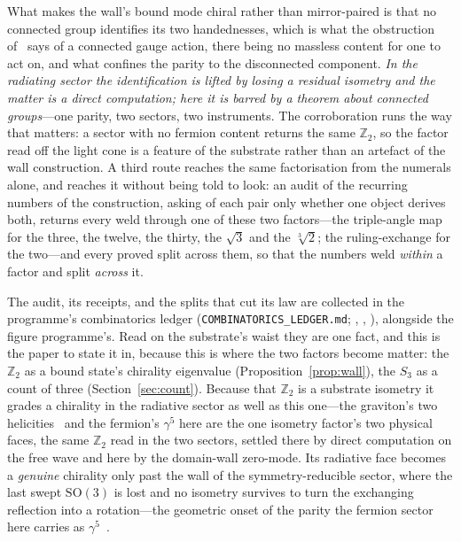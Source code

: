 \documentclass[11pt]{article}
\begin{document}
What makes the wall's bound mode chiral rather than mirror-paired is that no connected
group identifies its two handednesses, which is what the obstruction of~\cite{JanzenBoundary} says of a
connected gauge action, there being no massless content for one to act on, and what confines the parity to the disconnected component. \emph{In the radiating
sector the identification is lifted by losing a residual isometry and the matter is a direct computation; here
it is barred by a theorem about connected groups}---one parity, two sectors, two instruments. The
corroboration runs the way that matters: a sector with no fermion content returns the same $\mathbb{Z}_2$, so
the factor read off the light cone is a feature of the substrate rather than an artefact of the wall
construction. A third route reaches the same factorisation from the numerals alone, and reaches it without being told to look: an audit of the recurring numbers of the construction, asking of each pair only whether one object derives both, returns every weld through one of these two factors---the triple-angle map for the three, the twelve, the thirty, the $\sqrt3$ and the $\sqrt[3]{2}$; the ruling-exchange for the two---and every proved split across them, so that the numbers weld \emph{within} a factor and split \emph{across} it. 

The audit, its receipts, and the splits that cut its law are collected in the programme's combinatorics ledger (\texttt{COMBINATORICS\_LEDGER.md}; , , ), alongside the figure programme's. Read on the substrate's waist they are one fact, and this is the paper to state it in, because this is where the two factors become matter: the $\mathbb{Z}_2$ as a bound state's chirality eigenvalue (Proposition~\ref{prop:wall}), the $S_3$ as a count of three (Section~\ref{sec:count}). Because that $\mathbb{Z}_2$ is a substrate isometry it grades a chirality in the radiative sector as well as this one---the graviton's two helicities~\cite{JanzenDynamics} and the fermion's $\gamma^5$ here are the one isometry factor's two physical faces, the same $\mathbb{Z}_2$ read in the two sectors, settled there by direct computation on the free wave and here by the domain-wall zero-mode. Its radiative face becomes a \emph{genuine} chirality only past the wall of the symmetry-reducible sector, where the last swept $\mathrm{SO}(3)$ is lost and no isometry survives to turn the exchanging reflection into a rotation---the geometric onset of the parity the fermion sector here carries as $\gamma^5$~\cite{JanzenRange}.
\end{document}
